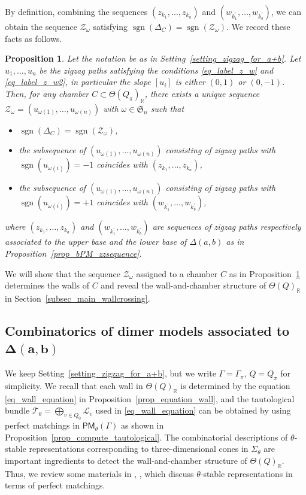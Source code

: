 \documentclass[10pt,a4paper]{amsart}
\numberwithin{equation}{section}
\newtheorem{Proposition}[Theorem]{Proposition}
\theoremstyle{definition}
\newcommand{\RR}{\mathbb{R}}
\newcommand{\calL}{\mathcal{L}}
\newcommand{\calT}{\mathcal{T}}
\newcommand{\calZ}{\mathcal{Z}}
\newcommand{\fkS}{\mathfrak{S}}
\newcommand{\sgn}{\operatorname{sgn}}
\newcommand{\PM}{\mathsf{PM}}
\newcommand{\perm}{\pi}
\newcommand{\permII}{\omega}
\begin{document}
By definition, combining the sequences $(z_{k_1}, \dots, z_{k_a})$ and $(w_{k^\prime_1}, \dots, w_{k^\prime_b})$,
we can obtain the sequence $\calZ_\permII$ satisfying $\sgn(\Delta_C)=\sgn(\calZ_\permII)$.
We record these facts as follows.

\begin{Proposition}
\label{prop_chamber_correspond_zigzag}
Let the notation be as in Setting~{\rm \ref{setting_zigzag_for_a+b}}.
Let $u_1, \dots, u_n$ be the zigzag paths satisfying the conditions \eqref{eq_label_z_w} and \eqref{eq_label_z_w2},
in particular the slope $[u_i]$ is either $(0,1)$ or $(0,-1)$.
Then, for any chamber $C\subset\Theta(Q_\perm)_\RR$, there exists a unique sequence
$\calZ_\permII=(u_{\permII(1)}, \dots, u_{\permII(n)})$ with $\permII\in\fkS_n$ such that
\begin{itemize}\itemsep=0pt
\item[\rm (a)] $\sgn(\Delta_C)=\sgn(\calZ_\permII)$,
\item[\rm (b)] the subsequence of $(u_{\permII(1)}, \dots, u_{\permII(n)})$ consisting of zigzag paths with $\sgn(u_{\permII(i)})=-1$
coincides with $(z_{k_1},\dots, z_{k_a})$,
\item[\rm (c)] the subsequence of $(u_{\permII(1)}, \dots, u_{\permII(n)})$ consisting of zigzag paths with $\sgn(u_{\permII(i)})=+1$
coincides with $(w_{k^\prime_1}, \dots, w_{k^\prime_b})$,
\end{itemize}
where $(z_{k_1},\dots, z_{k_a})$ and $(w_{k^\prime_1}, \dots, w_{k^\prime_b})$ are sequences of zigzag paths respectively
associated to the upper base and the lower base of $\Delta(a,b)$ as in Proposition~{\rm \ref{prop_bPM_zzsequence}}.
\end{Proposition}

We will show that the sequence $\calZ_\permII$ assigned to a chamber $C$ as in Proposition~\ref{prop_chamber_correspond_zigzag}
determines the walls of $C$ and reveal the wall-and-chamber structure of $\Theta(Q)_\RR$ in Section~\ref{subsec_main_wallcrossing}.

\subsection[Combinatorics of dimer models associated to Delta(a,b)]{Combinatorics of dimer models associated to $\boldsymbol{\Delta(a,b)}$}
\label{subsec_jigsaw}

We keep Setting~\ref{setting_zigzag_for_a+b}, but we write $\Gamma=\Gamma_\perm$, $Q=Q_\perm$ for simplicity.
We recall that each wall in $\Theta(Q)_\RR$ is determined by the equation \eqref{eq_wall_equation} in Proposition~\ref{prop_equation_wall},
and the tautological bundle $\calT_\theta=\bigoplus_{v\in Q_0}\calL_v$ used in \eqref{eq_wall_equation} can be obtained by using
perfect matchings in $\PM_\theta(\Gamma)$ as shown in Proposition~\ref{prop_compute_tautological}.
The combinatorial descriptions of $\theta$-stable representations corresponding to three-dimensional cones in $\Sigma_\theta$
are important ingredients to detect the wall-and-chamber structure of $\Theta(Q)_\RR$.
Thus, we review some materials in \cite[Section~4]{IU_moduli}, \cite[Section~4]{Moz}, \cite[Section~3]{CHT} which discuss
$\theta$-stable representations in terms of perfect matchings.
\end{document}
